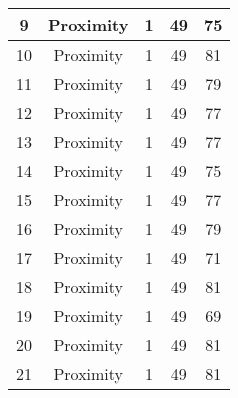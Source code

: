 \documentclass[results.tex]{subfiles}
\begin{document}
\begin{center}
\begin{tabular}{| c || c | c | c | c |}
            \hline
            9                       & Proximity                    & 1                      & 49                      & 75                   \\
            \hline
            10                      & Proximity                    & 1                      & 49                      & 81                   \\
            \hline
            11                      & Proximity                    & 1                      & 49                      & 79                   \\
            \hline
            12                      & Proximity                    & 1                      & 49                      & 77                   \\
            \hline
            13                      & Proximity                    & 1                      & 49                      & 77                   \\
            \hline
            14                      & Proximity                    & 1                      & 49                      & 75                   \\
            \hline
            15                      & Proximity                    & 1                      & 49                      & 77                   \\
            \hline
            16                      & Proximity                    & 1                      & 49                      & 79                   \\
            \hline
            17                      & Proximity                    & 1                      & 49                      & 71                   \\
            \hline
            18                      & Proximity                    & 1                      & 49                      & 81                   \\
            \hline
            19                      & Proximity                    & 1                      & 49                      & 69                   \\
            \hline
            20                      & Proximity                    & 1                      & 49                      & 81                   \\
            \hline
            21                      & Proximity                    & 1                      & 49                      & 81                   \\

\end{tabular}
\end{center}
\end{document}
